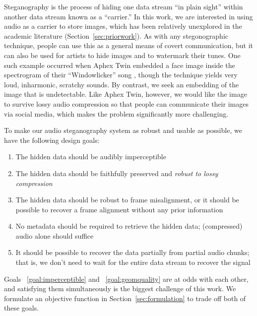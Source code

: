 \documentclass[runningheads]{llncs}
\begin{document}
Steganography is the process of hiding one data stream ``in plain sight'' within another data stream known as a ``carrier.''  In this work, we are interested in using audio as a carrier to store images, which has been relatively unexplored in the academic literature (Section~\ref{sec:priorwork}).  As with any stegonographic technique, people can use this as a general means of covert communication, but it can also be used for artists to hide images and to watermark their tunes.  One such example occurred when Aphex Twin embedded a face image inside the spectrogram of their ``Windowlicker'' song \cite{mathews2004music}, though the technique yields very loud, inharmonic, scratchy sounds.  By contrast, we seek an embedding of the image that is undetectable.  Like Aphex Twin, however, we would like the image to survive lossy audio compression so that people can communicate their images via social media, which makes the problem significantly more challenging.

To make our audio steganography system as robust and usable as possible, we have the following design goals:
\begin{enumerate}
    \item \label{goal:imperceptible} The hidden data should be audibly imperceptible
    \item \label{goal:geomquality} The hidden data should be faithfully preserved and {\em robust to lossy compression}
    \item \label{goal:misalignment} The hidden data should be robust to frame misalignment, or it should be possible to recover a frame alignment without any prior information
    \item \label{goal:metadata} No metadata should be required to retrieve the hidden data; (compressed) audio alone should suffice
    \item \label{goal:partial} It should be possible to recover the data partially from partial audio chunks; that is, we don't need to wait for the entire data stream to recover the signal
\end{enumerate}

Goals ~\ref{goal:imperceptible} and ~\ref{goal:geomquality} are at odds with each other, and satisfying them simultaneously is the biggest challenge of this work.  We formulate an objective function in Section~\ref{sec:formulation} to trade off both of these goals.
\end{document}
